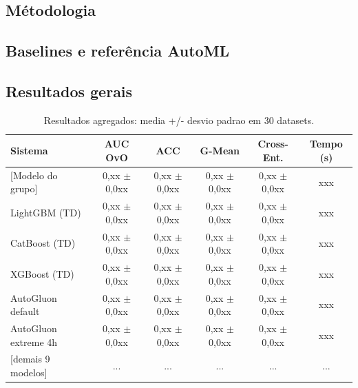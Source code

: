 \documentclass[11pt,a4paper]{article}
\begin{document}

\subsection{Métodologia}

\subsection{Baselines e referência AutoML}

\subsection{Resultados gerais}

\begin{table}[h]
\centering
\caption{Resultados agregados: media +/- desvio padrao em 30 datasets.}
\label{tab:resultados}
\footnotesize
\begin{tabular}{l c c c c c}
\toprule
\textbf{Sistema} & \textbf{AUC OvO} & \textbf{ACC} & \textbf{G-Mean} & \textbf{Cross-Ent.} & \textbf{Tempo (s)} \\
\midrule
{}[Modelo do grupo]    & 0,xx $\pm$ 0,0xx & 0,xx $\pm$ 0,0xx & 0,xx $\pm$ 0,0xx & 0,xx $\pm$ 0,0xx & xxx \\
LightGBM (TD)        & 0,xx $\pm$ 0,0xx & 0,xx $\pm$ 0,0xx & 0,xx $\pm$ 0,0xx & 0,xx $\pm$ 0,0xx & xxx \\
CatBoost (TD)        & 0,xx $\pm$ 0,0xx & 0,xx $\pm$ 0,0xx & 0,xx $\pm$ 0,0xx & 0,xx $\pm$ 0,0xx & xxx \\
XGBoost (TD)         & 0,xx $\pm$ 0,0xx & 0,xx $\pm$ 0,0xx & 0,xx $\pm$ 0,0xx & 0,xx $\pm$ 0,0xx & xxx \\
AutoGluon default    & 0,xx $\pm$ 0,0xx & 0,xx $\pm$ 0,0xx & 0,xx $\pm$ 0,0xx & 0,xx $\pm$ 0,0xx & xxx \\
AutoGluon extreme 4h & 0,xx $\pm$ 0,0xx & 0,xx $\pm$ 0,0xx & 0,xx $\pm$ 0,0xx & 0,xx $\pm$ 0,0xx & xxx \\
{}[demais 9 modelos]   & ... & ... & ... & ... & ... \\
\bottomrule
\end{tabular}
\end{table}
\end{document}
